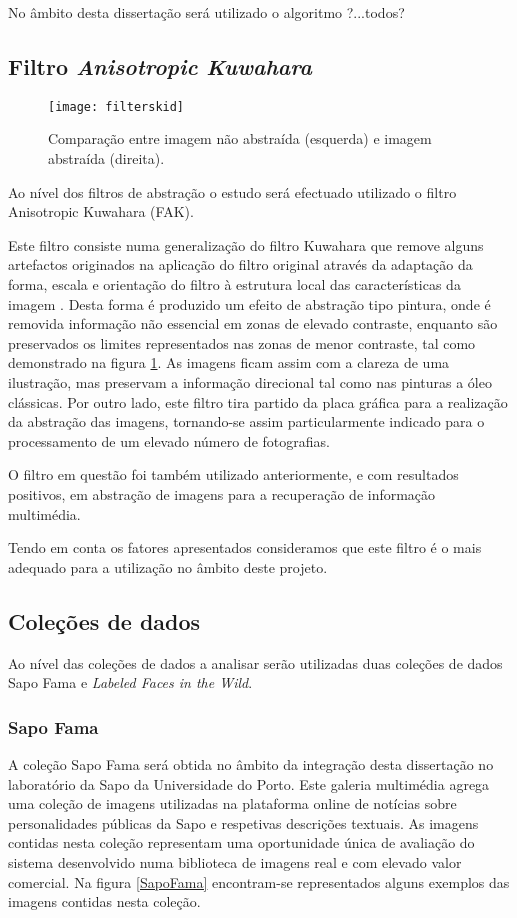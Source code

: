 No âmbito desta dissertação será utilizado o algoritmo ?...todos?

\subsection{	Filtro \textit{Anisotropic Kuwahara}}
\begin{figure}[h]
  \begin{center}
    \leavevmode
    \texttt{[image: filterskid]}
    \caption{Comparação entre imagem não abstraída (esquerda) e imagem abstraída (direita).}	
    \label{fig:filterskid}
  \end{center}
\end{figure}

Ao nível dos filtros de abstração o estudo será efectuado utilizado o filtro Anisotropic Kuwahara (FAK).

Este filtro consiste numa generalização do filtro Kuwahara que remove alguns artefactos originados na aplicação do filtro original através da adaptação da forma, escala e orientação do filtro à estrutura local das características da imagem \cite{Kyprianidis2009}. Desta forma é produzido um efeito de abstração tipo pintura, onde é removida informação não essencial em zonas de elevado contraste, enquanto são preservados os limites representados nas zonas de menor contraste, tal como demonstrado na figura \ref{fig:filterskid}. As imagens ficam assim com a clareza de uma ilustração, mas preservam a informação direcional tal como nas pinturas a óleo clássicas. Por outro lado, este filtro tira partido da placa gráfica para a realização da abstração das imagens, tornando-se assim particularmente indicado para o processamento de um elevado número de fotografias.

O filtro em questão foi também utilizado anteriormente, e com resultados positivos, em abstração de imagens para a recuperação de informação multimédia. 

Tendo em conta os fatores apresentados consideramos que este filtro é o mais adequado para a utilização no âmbito deste projeto.

\subsection{Coleções de dados}
Ao nível das coleções de dados a analisar serão utilizadas duas coleções de dados Sapo Fama e \textit{Labeled Faces in the Wild}.

\subsubsection{Sapo Fama}
A coleção Sapo Fama será obtida no âmbito da integração desta dissertação no laboratório da Sapo da Universidade do Porto. Este galeria multimédia agrega uma coleção de imagens utilizadas na plataforma online de notícias sobre personalidades públicas da Sapo e respetivas descrições textuais. As imagens contidas nesta coleção representam uma oportunidade única de avaliação do sistema desenvolvido numa biblioteca de imagens real e com elevado valor comercial. Na figura \ref{SapoFama} encontram-se representados alguns exemplos das imagens contidas nesta coleção. 

